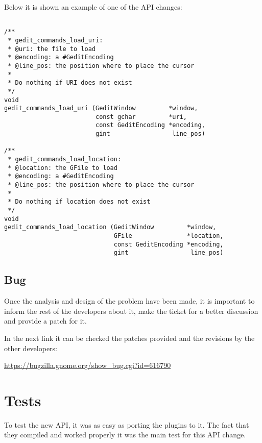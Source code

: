 Below it is shown an example of one of the API changes:

\begin{lstlisting}[style=GObject]

/**
 * gedit_commands_load_uri:
 * @uri: the file to load
 * @encoding: a #GeditEncoding
 * @line_pos: the position where to place the cursor
 *
 * Do nothing if URI does not exist
 */
void
gedit_commands_load_uri (GeditWindow         *window,
                         const gchar         *uri,
                         const GeditEncoding *encoding,
                         gint                 line_pos)

/**
 * gedit_commands_load_location:
 * @location: the GFile to load
 * @encoding: a #GeditEncoding
 * @line_pos: the position where to place the cursor
 *
 * Do nothing if location does not exist
 */
void
gedit_commands_load_location (GeditWindow         *window,
                              GFile               *location,
                              const GeditEncoding *encoding,
                              gint                 line_pos)

\end{lstlisting}

\newpage
\subsection{Bug}

Once the analysis and design of the problem have been made, it is important to inform the rest of the developers about it, make the ticket for a better discussion and provide a patch for it.

In the next link it can be checked the patches provided and the revisions by the other developers:

\noindent\url{https://bugzilla.gnome.org/show_bug.cgi?id=616790}

\section{Tests}

To test the new API, it was as easy as porting the plugins to it. The fact that they compiled and worked properly it was the main test for this API change.
